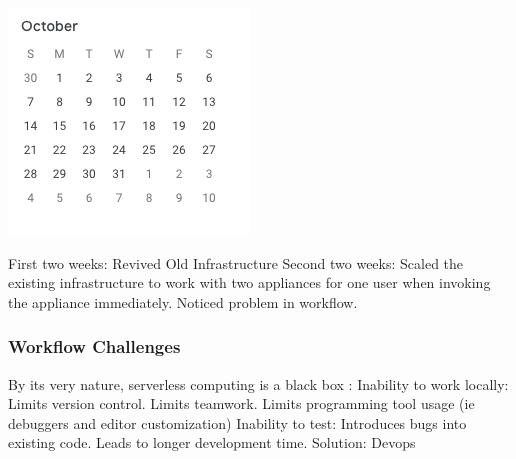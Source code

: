\documentclass{beamer}
\begin{document}
\begin{frame}
    \includegraphics[width=0.5\paperwidth,height=0.5\paperheight,keepaspectratio]{pictures/october}
    \begin{outline}
         First two weeks:
         Revived Old Infrastructure
         Second two weeks:
         Scaled the existing infrastructure to work with two appliances for one user
        when invoking the appliance immediately.
         Noticed problem in workflow.
    \end{outline}
\end{frame}

\begin{frame}
    \frametitle{Workflow Challenges}
    \begin{outline}
         By its very nature, serverless computing is a black box \cite{Baldini2017}:
         Inability to work locally:
         Limits version control.
         Limits teamwork.
         Limits programming tool usage (ie debuggers and editor customization)
         Inability to test:
         Introduces bugs into existing code.
         Leads to longer development time.
         Solution: Devops 
    \end{outline}
\end{frame}
\end{document}
